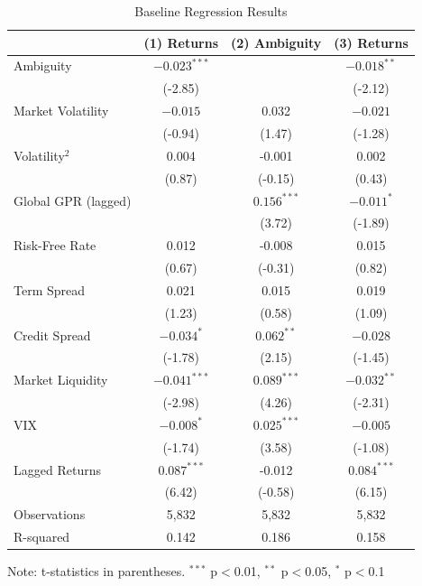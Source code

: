 \documentclass[preprint,12pt,authoryear]{elsarticle}
\begin{document}
\begin{table}[htbp]
\centering
\caption{Baseline Regression Results}
\label{tab:baseline_results}
\begin{tabularx}{\textwidth}{Xccc} 
\toprule
 & \multicolumn{1}{c}{(1) Returns} & \multicolumn{1}{c}{(2) Ambiguity} & \multicolumn{1}{c}{(3) Returns} \\ %
\midrule

Ambiguity & $-0.023^{***}$ &  & $-0.018^{**}$ \\
 & (-2.85) &  & (-2.12) \\
Market Volatility & $-0.015$ & 0.032 & $-0.021$ \\
 & (-0.94) & (1.47) & (-1.28) \\
Volatility$^2$ & 0.004 & -0.001 & 0.002 \\
 & (0.87) & (-0.15) & (0.43) \\
Global GPR (lagged) &  & $0.156^{***}$ & $-0.011^{*}$ \\
 &  & (3.72) & (-1.89) \\
Risk-Free Rate & 0.012 & -0.008 & 0.015 \\
 & (0.67) & (-0.31) & (0.82) \\
Term Spread & 0.021 & 0.015 & 0.019 \\
 & (1.23) & (0.58) & (1.09) \\
Credit Spread & $-0.034^{*}$ & $0.062^{**}$ & $-0.028$ \\
 & (-1.78) & (2.15) & (-1.45) \\
Market Liquidity & $-0.041^{***}$ & $0.089^{***}$ & $-0.032^{**}$ \\
 & (-2.98) & (4.26) & (-2.31) \\
VIX & $-0.008^{*}$ & $0.025^{***}$ & $-0.005$ \\
 & (-1.74) & (3.58) & (-1.08) \\
Lagged Returns & $0.087^{***}$ & -0.012 & $0.084^{***}$ \\
 & (6.42) & (-0.58) & (6.15) \\
\midrule
Observations & 5,832 & 5,832 & 5,832 \\
R-squared & 0.142 & 0.186 & 0.158 \\
\bottomrule
\end{tabularx}

\vspace{0.3em} %
\footnotesize
\raggedright
Note: t-statistics in parentheses. $^{***}$ p$<$0.01, $^{**}$ p$<$0.05, $^{*}$ p$<$0.1
\end{table}
\end{document}
